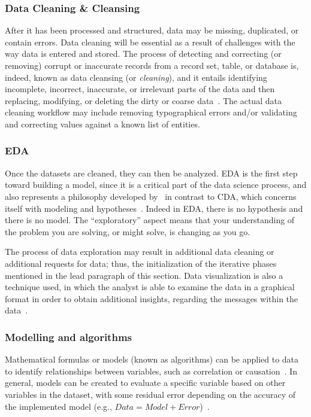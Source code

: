 \subsubsection{Data Cleaning \& Cleansing}
After it has been processed and structured, data may be missing, duplicated, or contain errors. Data cleaning will be essential as a result of challenges with the way data is entered and stored.
The process of detecting and correcting (or removing) corrupt or inaccurate records from a record set, table, or database is, indeed, known as data cleansing (or \textit{cleaning}),
and it entails identifying incomplete, incorrect, inaccurate, or irrelevant parts of the data and then replacing, modifying, or deleting the dirty or coarse data~\cite{Misc:2019_data_cleaning_wiki}.
The actual data cleaning workflow may include removing typographical errors and/or validating and correcting values against a known list of entities.

\subsubsection{\acl{EDA}}
Once the datasets are cleaned, they can then be analyzed.
\ac{EDA} is the first step toward building a model, since it is a critical part of the data science process, and also represents a philosophy developed by~\citeauthor{Article:future_of_data_tukey}
in contrast to \ac{CDA}, which concerns itself with modeling and hypotheses~\cite{Article:future_of_data_tukey}.
Indeed in \ac{EDA}, there is no hypothesis and there is no model. The ``exploratory'' aspect means that your understanding of the problem you are solving, or might solve, is changing as you go.

The process of data exploration may result in additional data cleaning or additional requests for data; thus, the initialization of the iterative phases mentioned in the lead paragraph of this section.
Data visualization is also a technique used, in which the analyst is able to examine the data in a graphical format in order to obtain additional insights, regarding the messages within the data~\cite{Book:doing_data_science}.

\subsubsection{Modelling and algorithms}
Mathematical formulas or models (known as algorithms) can be applied to data to identify relationships between variables, such as correlation or causation~\cite{Book:pruneau_2017}.
In general, models can be created to evaluate a specific variable based on other variables in the dataset, with some residual error depending on the accuracy of the implemented model (e.g., $Data = Model + Error$)~\cite{Book:judd_1989_data_model}.

